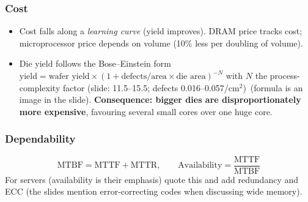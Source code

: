 \subsubsection{Cost}
\begin{itemize}
\item Cost falls along a \emph{learning curve} (yield improves). DRAM price tracks cost; microprocessor price depends on volume (10\% less per doubling of volume).
\item Die yield follows the Bose--Einstein form $\text{yield}=\text{wafer yield}\times(1+\text{defects/area}\times\text{die area})^{-N}$ with $N$ the process-complexity factor (slide: 11.5--15.5; defects 0.016--0.057/cm$^2$)\bs\ (formula is an image in the slide). \textbf{Consequence: bigger dies are disproportionately more expensive}, favouring several small cores over one huge core.
\end{itemize}

\subsubsection{Dependability}
\[
\text{MTBF}=\text{MTTF}+\text{MTTR},\qquad \text{Availability}=\frac{\text{MTTF}}{\text{MTBF}}
\]
For servers (availability is their emphasis) quote this and add redundancy and ECC (the slides mention error-correcting codes when discussing wide memory). 

